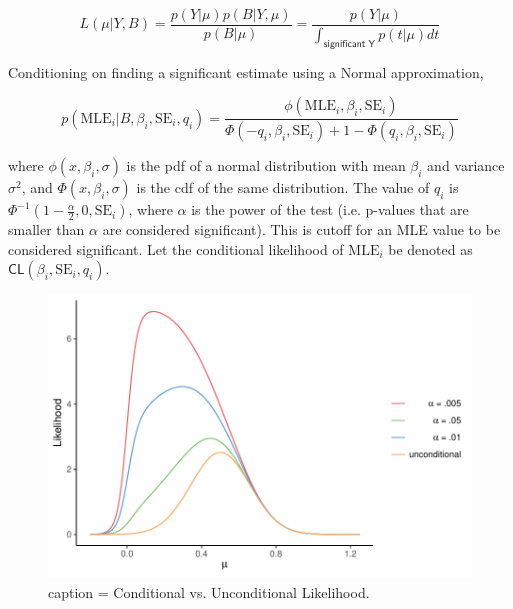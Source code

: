 \documentclass[AMA,STIX1COL]{WileyNJD-v2}\usepackage[]{graphicx}\usepackage[]{color}
\newenvironment{knitrout}{}{} %
\begin{document}
\begin{equation}\label{eq4}
L(\mu | Y,B) = \frac{p(Y| \mu)p(B| Y,\mu)}{p(B|\mu)} =  \frac{p(Y| \mu)}{\int_{\textsf{significant Y}} p(t| \mu) dt }
\end{equation}

Conditioning on finding a significant estimate using a Normal approximation, 

\begin{equation}\label{eq5}
p(\text{MLE}_i | B,\beta_i,\text{SE}_i,q_i) = \frac{\phi(\text{MLE}_i, \beta_i, \text{SE}_i)}{\Phi(-q_i, \beta_i, \text{SE}_i)+1-\Phi(q_i, \beta_i, \text{SE}_i)}
\end{equation}

where $\phi(x, \beta_i, \sigma)$ is the pdf of a normal distribution with mean $\beta_i$ and variance $\sigma^2$, and $\Phi(x, \beta_i, \sigma)$ is the cdf of the same distribution. The value of $q_i$ is $\Phi^{-1}(1-\frac{\alpha}{2}, 0 ,\text{SE}_i)$, where $\alpha$ is the power of the test (i.e. p-values that are smaller than $\alpha$ are considered significant). This is cutoff for an MLE value to be considered significant. Let the conditional likelihood of $\text{MLE}_i$  be denoted as $\textsf{CL}(\beta_i,\text{SE}_i, q_i)$.

\begin{figure}
\caption{caption = Conditional vs. Unconditional Likelihood.}
\begin{knitrout}
\color{fgcolor}

{\centering \includegraphics[width=6in]{figure/unnamed-chunk-3-1} 

}



\end{knitrout}
\end{figure}
\end{document}
